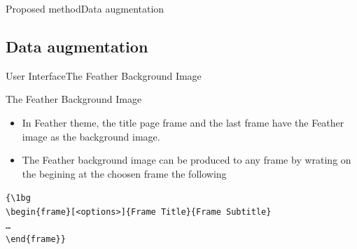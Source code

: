 \documentclass[10pt]{beamer}
\begin{document}
\begin{frame}{Proposed method}{Data augmentation}

\end{frame}


\subsection{Data augmentation}
\begin{frame}{User Interface}{The Feather Background Image}

\begin{block}{The Feather Background Image}
    \begin{itemize}
    \item In Feather theme, the title page frame and the last frame have the Feather image as the background image. 
    \item The Feather background image can be produced to any frame by wrating on the begining at the choosen frame the following
    \end{itemize} 
    
    \vspace{5pt} 
    
  {\tt \{\textbackslash 1bg\\
    \textbackslash begin\{frame\}[<options>]\{Frame Title\}\{Frame Subtitle\}\\
    \ldots\\
    \textbackslash end\{frame\}\}}
\end{block}
\end{frame}
\end{document}
